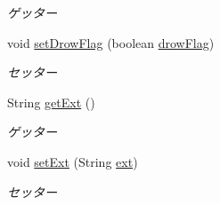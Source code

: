 \begin{DoxyCompactItemize}
\begin{DoxyCompactList}\small\item\em ゲッター \end{DoxyCompactList}\item 
void \hyperlink{classjp_1_1gr_1_1java__conf_1_1yuta__yoshinaga_1_1java__trumpcards_1_1_card_a52e0de709fd788e13ad930562e8e4be2}{set\+Drow\+Flag} (boolean \hyperlink{classjp_1_1gr_1_1java__conf_1_1yuta__yoshinaga_1_1java__trumpcards_1_1_card_a5ea32985f61009d9e2a99733299bc659}{drow\+Flag})
\begin{DoxyCompactList}\small\item\em セッター \end{DoxyCompactList}\item 
String \hyperlink{classjp_1_1gr_1_1java__conf_1_1yuta__yoshinaga_1_1java__trumpcards_1_1_card_ad24d31ccf25cf1eb2ad4304aa5f775cf}{get\+Ext} ()
\begin{DoxyCompactList}\small\item\em ゲッター \end{DoxyCompactList}\item 
void \hyperlink{classjp_1_1gr_1_1java__conf_1_1yuta__yoshinaga_1_1java__trumpcards_1_1_card_a883f9a927c94481d9fd2f3a226499b23}{set\+Ext} (String \hyperlink{classjp_1_1gr_1_1java__conf_1_1yuta__yoshinaga_1_1java__trumpcards_1_1_card_abb47646d84d1b03f3734defbefd32664}{ext})
\begin{DoxyCompactList}\small\item\em セッター \end{DoxyCompactList}\end{DoxyCompactItemize}
